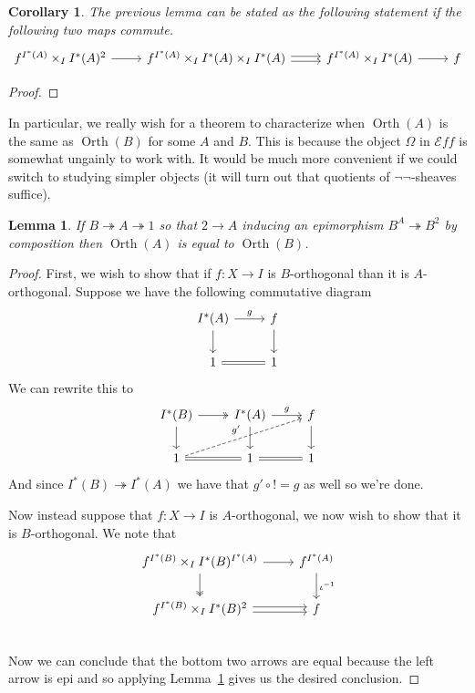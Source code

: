 \documentclass[12pt]{amsart}
\newcommand{\todo}[1]{{\color{red}{\LARGE #1}}}
\newcommand{\eff}{\mathcal{E}\!f\!f}
\newcommand{\epi}{\ensuremath{\twoheadrightarrow}}
\DeclareMathOperator{\orth}{Orth}
\newtheorem{cor}[thm]{Corollary}
\newtheorem{lem}[thm]{Lemma}
\begin{document}
\begin{cor}\label{lem:orth:orthpushout2}
  The previous lemma can be stated as the following statement if the
  following two maps commute.
  \[
    \begin{tikzcd}
      {f^{I^*(A)} \times_I I^*(A)^2} \ar[r] &
      {f^{I^*(A)} \times_I I^*(A) \times_I I^*(A)} \ar[r, shift left=0.2em] \ar[r, shift right=0.2em] &
      {f^{I^*(A)} \times_I I^*(A)} \ar[r] &
      f
    \end{tikzcd}
  \]
\end{cor}
\begin{proof}
  \todo{Should be a simple elaboration of pushout conditions}
\end{proof}
In particular, we really wish for a theorem to characterize when
$\orth(A)$ is the same as $\orth(B)$ for some $A$ and $B$. This is
because the object $\Omega$ in $\eff$ is somewhat ungainly to work
with. It would be much more convenient if we could switch to studying
simpler objects (it will turn out that quotients of $\neg\neg$-sheaves
suffice).
\begin{lem}\label{lem:orth:orthequiv}
  If $B \epi A \epi 1$ so that $2 \to A$ inducing an epimorphism
  $B^A \epi B^2$ by composition then $\orth(A)$ is equal to
  $\orth(B)$.
\end{lem}
\begin{proof}
  First, we wish to show that if $f : X \to I$ is $B$-orthogonal than
  it is $A$-orthogonal. Suppose we have the following commutative diagram
  \[
    \begin{tikzcd}
      I^*(A) \ar[r, "g"] \ar[d] & f \ar[d]\\
      1 \ar[r, equals] & 1
    \end{tikzcd}
  \]
  We can rewrite this to
  \[
    \begin{tikzcd}
      I^*(B) \ar[d] \ar[r, twoheadrightarrow] &I^*(A) \ar[r, "g"] \ar[d] & f \ar[d]\\
      1 \ar[r, equals] \ar[urr, dashed, "g'"] &1 \ar[r, equals] & 1
    \end{tikzcd}
  \]
  And since $I^*(B) \epi I^*(A)$ we have that $g' \circ ! = g$ as well
  so we're done.

  Now instead suppose that $f : X \to I$ is $A$-orthogonal, we now
  wish to show that it is $B$-orthogonal. We note that
  \[
    \begin{tikzcd}
      {f^{I^*(B)} \times_I I^*(B)^{I^*(A)}} \ar[r] \ar[d, twoheadrightarrow] & f^{I^*(A)} \ar[d, "\iota^{-1}"]\\
      {f^{I^*(B)} \times_I I^*(B)^2} \ar[r, shift left=0.2em] \ar[r, shift right=0.2em] & f\\
    \end{tikzcd}
  \]
  Now we can conclude that the bottom two arrows are equal because the
  left arrow is epi and so applying
  Lemma~\ref{lem:orth:orthpushout2} gives us the desired conclusion.
\end{proof}
\end{document}
